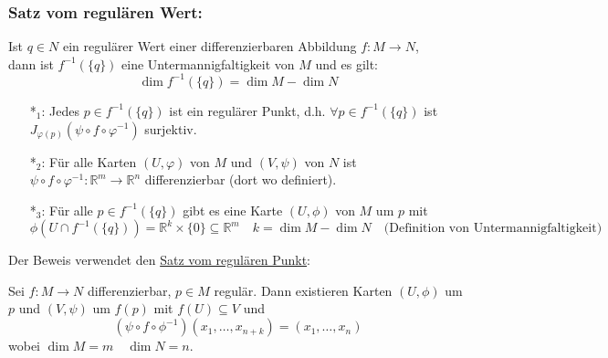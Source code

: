\documentclass[fleqn, 12pt, letterpaper]{article}
\newcommand{\txt}[1]{\text{#1}}
\begin{document}
\subsubsection*{Satz vom regulären Wert:}
Ist $q \in N$ ein regulärer Wert einer differenzierbaren Abbildung $f : M \to N$,\\
dann ist $f^{-1}(\{q\})$ eine Untermannigfaltigkeit von $M$ und es gilt:
\[
\dim f^{-1}(\{q\}) = \dim M - \dim N
\]
\begin{itemize}
  \item[*$_1$:] Jedes $p \in f^{-1}(\{q\})$ ist ein regulärer Punkt, d.h. $\forall p \in f^{-1}(\{q\})$ ist $J_{\varphi(p)}(\psi \circ f \circ \varphi^{-1})$ surjektiv.
  
  \item[*$_2$:] Für alle Karten $(U, \varphi)$ von $M$ und $(V, \psi)$ von $N$ ist $\psi \circ f \circ \varphi^{-1}: \mathbb{R}^m \to \mathbb{R}^n$ differenzierbar (dort wo definiert).
  
  \item[*$_3$:] Für alle $p \in f^{-1}(\{q\})$ gibt es eine Karte $(U, \phi)$ von $M$ um $p$ mit
  \[
  \phi \left(U \cap f^{-1}(\{q\}) \right) = \mathbb{R}^k \times \{0\}\subseteq \mathbb{R}^m \quad k = \dim M - \dim N \quad \txt{(Definition von Untermannigfaltigkeit)}
  \]
\end{itemize}
Der Beweis verwendet den \underline{Satz vom regulären Punkt}:

Sei $f: M \to N$ differenzierbar, $p \in M$ regulär. Dann existieren Karten $(U, \phi)$ um $p$ und $(V, \psi)$ um $f(p)$ mit $f(U) \subseteq V$ und
\[
(\psi \circ f \circ \phi^{-1})(x_1,\dots, x_{n+k}) = (x_1,\dots,x_n)
\]
wobei $\dim M = m\quad \dim N = n$.
\end{document}
